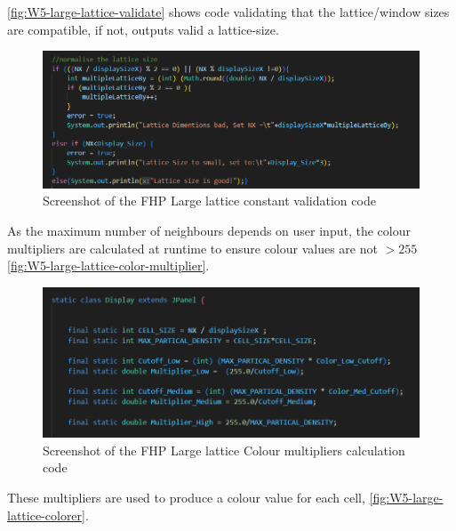 \autoref{fig:W5-large-lattice-validate} shows code validating that the lattice/window sizes are compatible, if not, outputs valid a lattice-size.
\begin{figure}[H] 
   \centering
   \includegraphics[width=0.9\columnwidth]{Figures/Week 5/large-lattice/FHP large-lat validate.png}
   \caption{Screenshot of the FHP Large lattice constant validation code}
   \label{fig:W5-large-lattice-validate}
\end{figure}

As the maximum number of neighbours depends on user input, the colour multipliers are calculated at runtime to ensure colour values are not $>255$ \autoref{fig:W5-large-lattice-color-multiplier}.
\begin{figure}[H] 
   \centering
   \includegraphics[width=1\columnwidth]{Figures/Week 5/large-lattice/FHP large-lat color multiplier.png}
   \caption{Screenshot of the FHP Large lattice Colour multipliers calculation code}
   \label{fig:W5-large-lattice-color-multiplier}
\end{figure}

These multipliers are used to produce a colour value for each cell, \autoref{fig:W5-large-lattice-colorer}.

